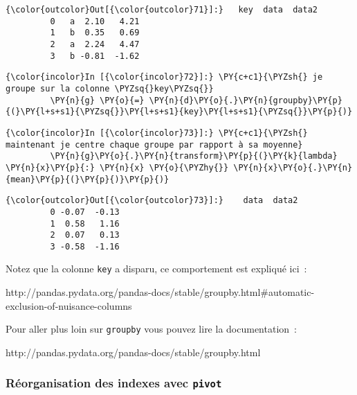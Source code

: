 \begin{Verbatim}[commandchars=\\\{\}]
{\color{outcolor}Out[{\color{outcolor}71}]:}   key  data  data2
         0   a  2.10   4.21
         1   b  0.35   0.69
         2   a  2.24   4.47
         3   b -0.81  -1.62
\end{Verbatim}
            
    \begin{Verbatim}[commandchars=\\\{\}]
{\color{incolor}In [{\color{incolor}72}]:} \PY{c+c1}{\PYZsh{} je groupe sur la colonne \PYZsq{}key\PYZsq{}}
         \PY{n}{g} \PY{o}{=} \PY{n}{d}\PY{o}{.}\PY{n}{groupby}\PY{p}{(}\PY{l+s+s1}{\PYZsq{}}\PY{l+s+s1}{key}\PY{l+s+s1}{\PYZsq{}}\PY{p}{)}
\end{Verbatim}


    \begin{Verbatim}[commandchars=\\\{\}]
{\color{incolor}In [{\color{incolor}73}]:} \PY{c+c1}{\PYZsh{} maintenant je centre chaque groupe par rapport à sa moyenne}
         \PY{n}{g}\PY{o}{.}\PY{n}{transform}\PY{p}{(}\PY{k}{lambda} \PY{n}{x}\PY{p}{:} \PY{n}{x} \PY{o}{\PYZhy{}} \PY{n}{x}\PY{o}{.}\PY{n}{mean}\PY{p}{(}\PY{p}{)}\PY{p}{)}
\end{Verbatim}


\begin{Verbatim}[commandchars=\\\{\}]
{\color{outcolor}Out[{\color{outcolor}73}]:}    data  data2
         0 -0.07  -0.13
         1  0.58   1.16
         2  0.07   0.13
         3 -0.58  -1.16
\end{Verbatim}
            
    Notez que la colonne \texttt{key} a disparu, ce comportement est
expliqué ici~:

http://pandas.pydata.org/pandas-docs/stable/groupby.html\#automatic-exclusion-of-nuisance-columns

Pour aller plus loin sur \texttt{groupby} vous pouvez lire la
documentation~:

http://pandas.pydata.org/pandas-docs/stable/groupby.html

    \hypertarget{ruxe9organisation-des-indexes-avec-pivot}{%
\subsubsection{\texorpdfstring{Réorganisation des indexes avec
\texttt{pivot}}{Réorganisation des indexes avec pivot}}\label{ruxe9organisation-des-indexes-avec-pivot}}

